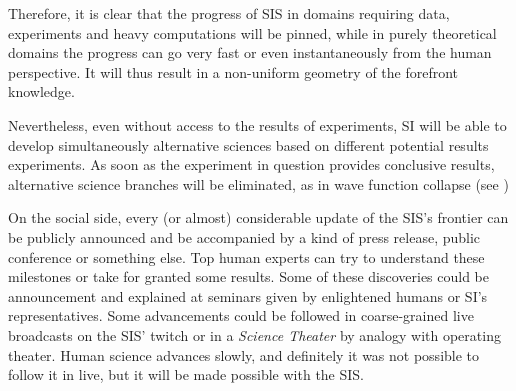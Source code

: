 \documentclass[a4paper,11pt]{article}
\begin{document}
Therefore, it is clear that the progress of SIS in domains requiring data, experiments and heavy computations will be pinned, while in purely theoretical domains the progress can go very fast or even instantaneously from the human perspective. It will thus result in a non-uniform geometry of the forefront knowledge. 

Nevertheless, even without access to the results of experiments, SI will be able to develop simultaneously alternative sciences based on different potential results experiments. As soon as the experiment in question provides conclusive results, alternative science branches will be eliminated, as in wave function collapse (see )

On the social side, every (or almost) considerable update of the SIS's frontier can be publicly announced and be accompanied by a kind of press release, public conference or something else. Top human experts can try to understand these milestones or take for granted some results. Some of these discoveries could be announcement and explained at seminars given by enlightened humans or SI's representatives. Some advancements could be followed in coarse-grained live broadcasts on the SIS' twitch or in a \emph{Science Theater} by analogy with operating theater. Human science advances slowly, and definitely it was not possible to follow it in live, but it will be made possible with the SIS.
\end{document}
